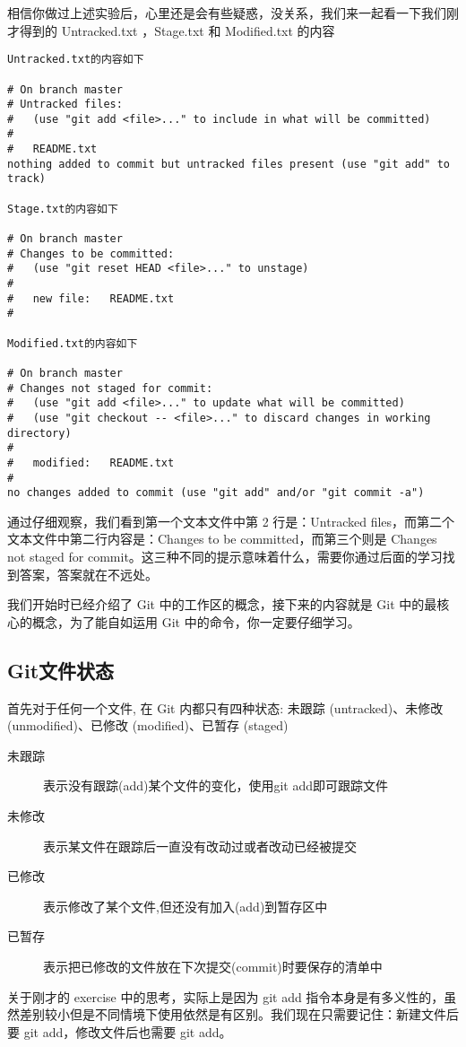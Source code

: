 相信你做过上述实验后，心里还是会有些疑惑，没关系，我们来一起看一下我们刚才得到的 Untracked.txt ，Stage.txt 和 Modified.txt 的内容
\begin{verbatim}
Untracked.txt的内容如下

# On branch master
# Untracked files:
#   (use "git add <file>..." to include in what will be committed)
#
#	README.txt
nothing added to commit but untracked files present (use "git add" to track)

Stage.txt的内容如下

# On branch master
# Changes to be committed:
#   (use "git reset HEAD <file>..." to unstage)
#
#	new file:   README.txt
#

Modified.txt的内容如下

# On branch master
# Changes not staged for commit:
#   (use "git add <file>..." to update what will be committed)
#   (use "git checkout -- <file>..." to discard changes in working directory)
#
#	modified:   README.txt
#
no changes added to commit (use "git add" and/or "git commit -a")
\end{verbatim}
通过仔细观察，我们看到第一个文本文件中第 2 行是：Untracked files，而第二个文本文件中第二行内容是：Changes to be committed，而第三个则是 Changes not staged for commit。这三种不同的提示意味着什么，需要你通过后面的学习找到答案，答案就在不远处。

我们开始时已经介绍了 Git 中的工作区的概念，接下来的内容就是 Git 中的最核心的概念，为了能自如运用 Git 中的命令，你一定要仔细学习。

\subsection{Git文件状态}
首先对于任何一个文件, 在 Git 内都只有四种状态: 未跟踪 (untracked)、未修改 (unmodified)、已修改 (modified)、已暂存 (staged)
\begin{description}
\item[未跟踪] 表示没有跟踪(add)某个文件的变化，使用git add即可跟踪文件
\item[未修改] 表示某文件在跟踪后一直没有改动过或者改动已经被提交
\item[已修改] 表示修改了某个文件,但还没有加入(add)到暂存区中
\item[已暂存] 表示把已修改的文件放在下次提交(commit)时要保存的清单中
\end{description}

\begin{note}
关于刚才的 exercise 中的思考，实际上是因为 git add 指令本身是有多义性的，虽然差别较小但是不同情境下使用依然是有区别。我们现在只需要记住：新建文件后要 git add，修改文件后也需要 git add。
\end{note}

